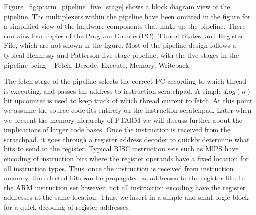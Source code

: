 Figure~\ref{fig:ptarm_pipeline_five_stage} shows a block diagram view of the pipeline. 
The multiplexers within the pipeline have been omitted in the figure for a simplified view of the hardware components that make up the pipeline.
There contains four copies of the Program Counter(PC), Thread States, and Register File, which are not shown in the figure.
Most of the pipeline design follows a typical Hennessy and Patterson five stage pipeline, with the five stages in the pipeline being -- Fetch, Decode, Execute, Memory, Writeback.


The fetch stage of the pipeline selects the correct PC according to which thread is executing, and passes the address to instruction scratchpad.
A simple $Log(n)$ bit upcounter is used to keep track of which thread current to fetch.  
At this point we assume the source code fits entirely on the instruction scratchpad.
Later when we present the memory hierarchy of PTARM we will discuss further about the implications of larger code bases.
Once the instruction is received from the scratchpad, it goes through a register address decoder to quickly determine what bits to send to the register.
Typical RISC instruction sets such as MIPS have encoding of instruction bits where the register operands have a fixed location for all instruction types.
Thus, once the instruction is received from instruction memory, the selected bits can be propagated as addresses to the register file. 
In the ARM instruction set however, not all instruction encoding have the register addresses at the same location. 
Thus, we insert in a simple and small logic block for a quick decoding of register addresses.

